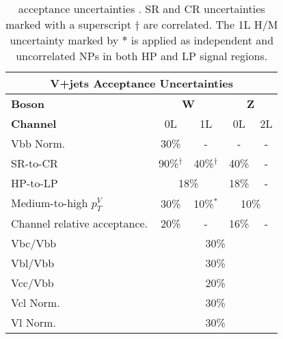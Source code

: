 \begin{table}[!htbp] 
  \footnotesize\centering
  \setlength{\tabcolsep}{0.5em} %
  \begin{tabular}{l|c|c|c|c}
      \toprule\hline
      \multicolumn{5}{c}{V+jets Acceptance Uncertainties}            
      \\ \hline
      \textbf{Boson}      & \multicolumn{2}{c|}{\textbf{W}} & \multicolumn{2}{c}{\textbf{Z}} 
      \\ \hline
      \textbf{Channel}    & 0L          & 1L         & 0L         & 2L          
      \\ \hline
      Vbb Norm.           &   30\%      &     -      &     -      &          -  
      \\ \hline
      SR-to-CR               &   90\%$^\dagger$         & 40\%$^\dagger$ &      40\%     & -         
      \\ \hline
      HP-to-LP               & \multicolumn{2}{c|}{18\%}             &   18\%      & -         
      \\ \hline
      Medium-to-high $p_T^V$ &   30\%      & 10\%$^*$       & \multicolumn{2}{c}{10\%}          
      \\ \hline
      Channel relative acceptance.             &   20\%      &   -        &    16\%    & -
      \\ \hline
      Vbc/Vbb             & \multicolumn{4}{c}{30\%}                       
      \\ \hline
      Vbl/Vbb             & \multicolumn{4}{c}{30\%}                       
      \\ \hline
      Vcc/Vbb             & \multicolumn{4}{c}{20\%}                       
      \\ \hline
      Vcl Norm.           & \multicolumn{4}{c}{30\%}                       
      \\ \hline
      Vl Norm.            & \multicolumn{4}{c}{30\%}                       
      \\ \hline\bottomrule
  \end{tabular}
  \caption{
    \Vjets acceptance uncertainties \cite{Dao:2688371}.
    \Wjets SR and CR uncertainties marked with a superscript $\dagger$ are correlated.
    The 1L \Wjets H/M uncertainty marked by $*$ is applied as independent and uncorrelated NPs in both HP and LP signal regions.
  }
  \label{tab:Vjets acceptance uncerts}
\end{table}